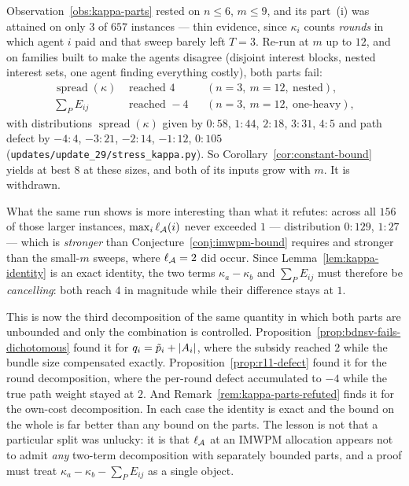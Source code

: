 \begin{remark}
\label{rem:kappa-parts-refuted}
Observation~\ref{obs:kappa-parts} rested on $n \le 6$, $m \le 9$, and its part~(i)
was attained on only $3$ of $657$ instances --- thin evidence, since $\kappa_i$
counts \emph{rounds} in which agent $i$ paid and that sweep barely left
$T = 3$. Re-run at $m$ up to $12$, and on families built to make the agents
disagree (disjoint interest blocks, nested interest sets, one agent finding
everything costly), both parts fail:
\begin{align*}
  \operatorname{spread}(\kappa) &\text{ reached } 4
    &&(n=3,\ m=12,\ \text{nested}), \\
  \textstyle\sum_P E_{ij} &\text{ reached } -4
    &&(n=3,\ m=12,\ \text{one-heavy}),
\end{align*}
with distributions $\operatorname{spread}(\kappa)$ given by $0{:}58$, $1{:}44$,
$2{:}18$, $3{:}31$, $4{:}5$ and path defect by $-4{:}4$, $-3{:}21$, $-2{:}14$,
$-1{:}12$, $0{:}105$ (\texttt{updates/update\_29/stress\_kappa.py}). So
Corollary~\ref{cor:constant-bound} yields at best $8$ at these sizes, and both of
its inputs grow with $m$. It is withdrawn.
\end{remark}

What the same run shows is more interesting than what it refutes: across all
$156$ of those larger instances, $\max_i \ell_{\mathcal{A}}(i)$ never exceeded $1$
--- distribution $0{:}129$, $1{:}27$ --- which is \emph{stronger} than
Conjecture~\ref{conj:imwpm-bound} requires and stronger than the small-$m$ sweeps,
where $\ell_{\mathcal{A}} = 2$ did occur. Since Lemma~\ref{lem:kappa-identity} is an
exact identity, the two terms $\kappa_a - \kappa_b$ and $\sum_P E_{ij}$ must
therefore be \emph{cancelling}: both reach $4$ in magnitude while their difference
stays at $1$.

\begin{remark}
\label{rem:cancellation}
This is now the third decomposition of the same quantity in which both parts are
unbounded and only the combination is controlled.
Proposition~\ref{prop:bdnsv-fails-dichotomous} found it for
$q_i = \tilde{p}_i + \left\lvert A_{i}\right\rvert$, where the subsidy reached $2$ while
the bundle size compensated exactly.
Proposition~\ref{prop:r11-defect} found it for the round decomposition, where the
per-round defect accumulated to $-4$ while the true path weight stayed at $2$. And
Remark~\ref{rem:kappa-parts-refuted} finds it for the own-cost decomposition. In
each case the identity is exact and the bound on the whole is far better than any
bound on the parts. The lesson is not that a particular split was unlucky: it is
that $\ell_{\mathcal{A}}$ at an IMWPM allocation appears not to admit \emph{any}
two-term decomposition with separately bounded parts, and a proof must treat
$\kappa_a - \kappa_b - \sum_P E_{ij}$ as a single object.
\end{remark}

